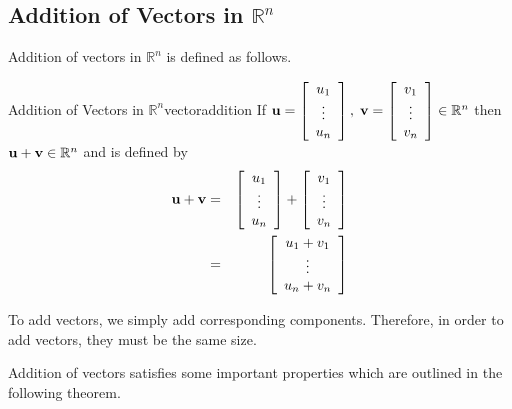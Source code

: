 \subsection{Addition of Vectors in \texorpdfstring{$\mathbb{R}^n$}{Rn}}

Addition of vectors in $\mathbb{R}^n$ is defined as follows.  

\begin{definition}{Addition of Vectors in $\mathbb{R}^n$}{vectoraddition}
If $\mathbf{u}=\left[ \begin{array}{c}
u_{1} \\
\vdots \\
u_{n}
\end{array}
\right],\; \mathbf{v}= \left[ \begin{array}{c}
v_{1} \\
\vdots \\
v_{n}
\end{array}
\right] \in \mathbb{R}^{n}$
then $\mathbf{u}+\mathbf{v}\in \mathbb{R}^{n}$ and is defined by
\begin{eqnarray*}
\mathbf{u}+\mathbf{v} &=& \left[ \begin{array}{c}
u_{1} \\
\vdots \\
u_{n}
\end{array}
\right] +  \left[ \begin{array}{c}
v_{1} \\
\vdots \\
v_{n}
\end{array} \right]\\
& =& \left[ \begin{array}{c}
u_{1}+v_{1} \\
\vdots \\
u_{n}+v_{n}
\end{array}
\right]
\end{eqnarray*}
\end{definition}

To add vectors, we simply add corresponding components. Therefore, in order to add vectors, they must
be the same size.

Addition of vectors satisfies some important properties which are outlined in the following theorem.  

